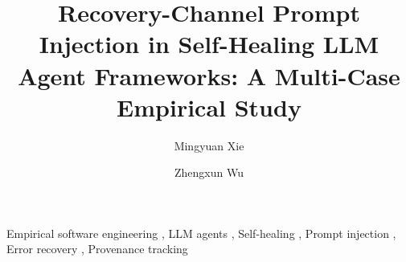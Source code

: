 \documentclass[review,3p,authoryear]{elsarticle}
\begin{document}
\begin{frontmatter}

    \title{Recovery-Channel Prompt Injection in Self-Healing LLM Agent Frameworks: A Multi-Case Empirical Study}

    \author{Mingyuan Xie}
    \author{Zhengxun Wu}
    \address{School of Information Management, Qingdao University of Technology, Qingdao, Shandong, China}

    

    \begin{keyword}
        Empirical software engineering \sep
        LLM agents \sep
        Self-healing \sep
        Prompt injection \sep
        Error recovery \sep
        Provenance tracking
    \end{keyword}
\end{frontmatter}












\end{document}
